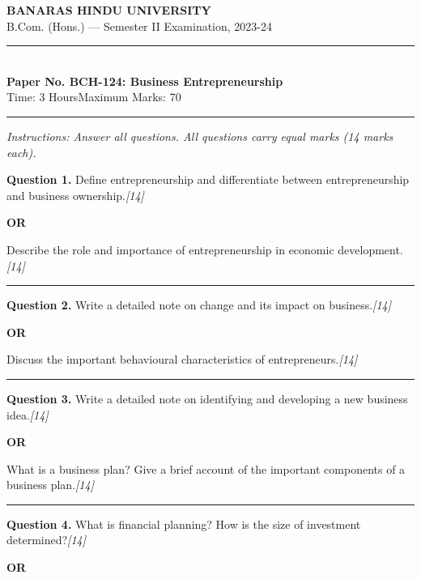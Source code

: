 \documentclass[11pt,a4paper]{article}
\newcommand{\pts}[1]{\hfill   \textit{[#1]}}
\begin{document}
\begin{center}
  {\large\bfseries BANARAS HINDU UNIVERSITY}\\[2pt]
  {\normalsize B.Com. (Hons.) --- Semester II Examination, 2023-24}\\[6pt]
  \rule{0.8\linewidth}{0.5pt}\\[6pt]
  {\large\bfseries Paper No. BCH-124: Business Entrepreneurship}\\[4pt]
  {\normalsize Time: 3 Hours\hfill Maximum Marks: 70}
\end{center}

\rule{\linewidth}{0.4pt}

\smallskip



\noindent   \textit{Instructions: Answer all questions. All questions carry equal marks (14 marks each).}

\bigskip




\noindent   \textbf{Question 1.}
Define entrepreneurship and differentiate between entrepreneurship and business ownership.\pts{14}

\centerline{   \textbf{OR}}

Describe the role and importance of entrepreneurship in economic development.\pts{14}

\medskip\rule{\linewidth}{0.2pt}




\noindent   \textbf{Question 2.}
Write a detailed note on change and its impact on business.\pts{14}

\centerline{   \textbf{OR}}

Discuss the important behavioural characteristics of entrepreneurs.\pts{14}

\medskip\rule{\linewidth}{0.2pt}




\noindent   \textbf{Question 3.}
Write a detailed note on identifying and developing a new business idea.\pts{14}

\centerline{   \textbf{OR}}

What is a business plan? Give a brief account of the important components of a business plan.\pts{14}

\medskip\rule{\linewidth}{0.2pt}




\noindent   \textbf{Question 4.}
What is financial planning? How is the size of investment determined?\pts{14}

\centerline{   \textbf{OR}}
\end{document}
